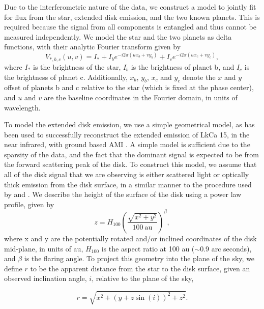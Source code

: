 \documentclass[11pt,twocolumn,twocolappendix]{aastex631}
\begin{document}
Due to the interferometric nature of the data, we construct a model to jointly fit for flux from the star, extended disk emission, and the two known planets. This is required because the signal from all components is entangled and thus cannot be measured independently. We model the star and the two planets as delta functions, with their analytic Fourier transform given by
\begin{equation}
    V_{*,b,c}(u,v) = I_* + I_b e^{-i 2 \pi (ux_b + vy_b)} + I_c e^{-i 2 \pi (ux_c + vy_c)},
    \label{eqn:pts_vis_eqn}
\end{equation}
where $I_*$ is the brightness of the star, $I_b$ is the brightness of planet b, and $I_c$ is the brightness of planet c. Additionally, $x_b$, $y_b$, $x_c$ and $y_c$ denote the $x$ and $y$ offset of planets b and c relative to the star (which is fixed at the phase center), and $u$ and $v$ are the baseline coordinates in the Fourier domain, in units of wavelength.

To model the extended disk emission, we use a simple geometrical model, as {has been used to successfully} reconstruct the extended emission of LkCa 15, in the near infrared, with ground based AMI \citep{2022ApJ...931....3B,2023ApJ...953...55S}. A simple model is sufficient due to the sparsity of the data, and the fact that the dominant signal is expected to be from the forward scattering peak of the disk. To construct this model, we assume that all of the disk signal that we are observing is {either scattered light or} optically thick emission from the disk surface, in a similar manner to the procedure used by \cite{2016A&A...596A..70S} and \cite{2018A&A...619A.160S}. We describe the height of the surface of the disk using a power law profile, given by
\begin{equation}
\label{eqn:z}
    z = H_{100}\left(\frac{\sqrt{x^2 + y^2}}{100 \mathrm{\: au}}\right)^{\beta},
\end{equation}
where x and y are the potentially rotated and/or inclined coordinates of the disk mid-plane, in units of au, $H_{100}$ is the aspect ratio at 100 au ($\sim$0.9 arc seconds), and $\beta$ is the flaring angle. To project this geometry into the plane of the sky, we define $r$ to be the apparent distance from the star to the disk surface, given an observed inclination angle, $i$, relative to the plane of the sky,

\begin{equation}
\label{eqn:rad}
    r = \sqrt{x^2 + (y + z \sin(i))^2 + z^2}.
\end{equation}
\end{document}
